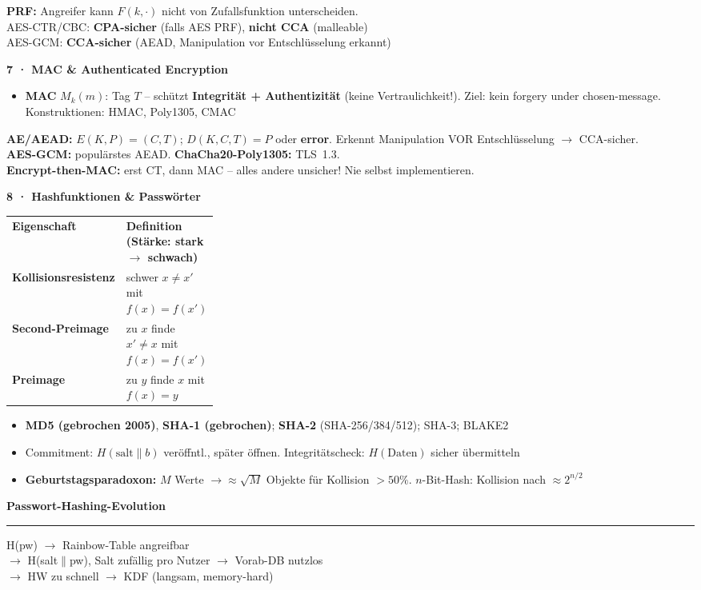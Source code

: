 \documentclass[11pt,a4paper]{article}
\newcommand{\tabstart}{%
  \rowcolors{2}{rowgray}{white}%
}
\newcommand{\tabend}{\rowcolors{1}{}{}}
\newcommand{\h}[1]{%
  \vspace{3pt}%
  \noindent\colorbox{hdr2}{%
    \parbox{\dimexpr\linewidth-2\fboxsep}{\color{white}\bfseries #1}}%
  \par\vspace{1pt}%
}
\newcommand{\hh}[1]{%
  \vspace{2pt}%
  \noindent\textbf{#1}\par%
  {\color{gray}\hrule height 0.5pt}\par\vspace{0.5pt}%
}
\newenvironment{ibox}{\begin{mdframed}[style=infoS]}{\end{mdframed}}
\newenvironment{tbox}{\begin{mdframed}[style=treeS]\ttfamily\small}{\end{mdframed}}
\newcommand{\warn}[1]{{\color{warnred}\textbf{#1}}}
\newcommand{\good}[1]{{\color{goodgrn}\textbf{#1}}}
\newcommand{\THH}[1]{\cellcolor{hdrtbl}\color{white}\textbf{#1}}
\begin{document}
\begin{multicols}{2}
\begin{ibox}
\textbf{PRF:} Angreifer kann $F(k,\cdot)$ nicht von Zufallsfunktion unterscheiden.\\
AES-CTR/CBC: \good{CPA-sicher} (falls AES PRF), \warn{nicht CCA} (malleable)\\
AES-GCM: \good{CCA-sicher} (AEAD, Manipulation vor Entschlüsselung erkannt)
\end{ibox}

\h{7 · MAC \& Authenticated Encryption}
\begin{itemize}
\item \textbf{MAC} $M_k(m)$: Tag $T$ -- schützt \textbf{Integrität + Authentizität}
  (keine Vertraulichkeit!). Ziel: kein forgery under chosen-message.
  Konstruktionen: HMAC, Poly1305, CMAC
\end{itemize}
\begin{ibox}
\textbf{AE/AEAD:} $E(K,P)=(C,T)$; $D(K,C,T)=P$ oder \textbf{error}.
Erkennt Manipulation VOR Entschlüsselung $\to$ CCA-sicher.\\
\textbf{AES-GCM:} populärstes AEAD.
\textbf{ChaCha20-Poly1305:} TLS~1.3.\\
\textbf{Encrypt-then-MAC:} erst CT, dann MAC -- alles andere unsicher!
Nie selbst implementieren.\\
\end{ibox}


\h{8 · Hashfunktionen \& Passwörter}

\tabstart
\begin{tabularx}{\linewidth}{K{0.3\linewidth}L}
\THH{Eigenschaft} & \THH{Definition (Stärke: stark $\to$ schwach)}\\
\textbf{Kollisionsresistenz} & schwer $x\ne x'$ mit $f(x)=f(x')$\\
\textbf{Second-Preimage}     & zu $x$ finde $x'\ne x$ mit $f(x)=f(x')$\\
\textbf{Preimage}            & zu $y$ finde $x$ mit $f(x)=y$\\
\end{tabularx}
\tabend

\begin{itemize}
\item \warn{MD5 (gebrochen 2005)}, \warn{SHA-1 (gebrochen)};
  \good{SHA-2} (SHA-256/384/512); SHA-3; BLAKE2
\item Commitment: $H(\mathrm{salt}\|b)$ veröffntl., später öffnen.
  Integritätscheck: $H(\mathrm{Daten})$ sicher übermitteln
\item \textbf{Geburtstagsparadoxon:} $M$ Werte $\to \approx\!\sqrt{M}$
  Objekte für Kollision ${>}50\%$. $n$-Bit-Hash: Kollision nach $\approx 2^{n/2}$
\end{itemize}
\hh{Passwort-Hashing-Evolution}
\begin{tbox}
H(pw) $\to$ Rainbow-Table angreifbar\\
$\to$ H(salt$\|$pw), Salt zufällig pro Nutzer $\to$ Vorab-DB nutzlos\\
$\to$ HW zu schnell $\to$ KDF (langsam, memory-hard)
\end{tbox}


\end{multicols}
\end{document}
